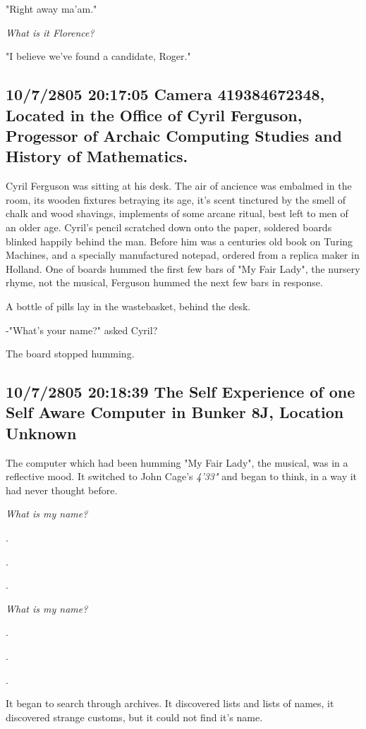 \documentclass[12pt]{article}
\begin{document}
"Right away ma'am."

\emph{What is it Florence?}

"I believe we've found a candidate, Roger."

\subsection*{10/7/2805 20:17:05 Camera 419384672348, Located in the Office of Cyril Ferguson, Progessor of Archaic Computing Studies and History of Mathematics.}
\label{sec:orgd55761e}

Cyril Ferguson was sitting at his desk. The air of ancience was embalmed in the room, its wooden fixtures betraying its age, it's scent tinctured by the smell of chalk and wood shavings, implements of some arcane ritual, best left to men of an older age. Cyril's pencil scratched down onto the paper, soldered boards blinked happily behind the man. Before him was a centuries old book on Turing Machines, and a specially manufactured notepad, ordered from a replica maker in Holland. One of boards hummed the first few bars of "My Fair Lady", the nursery rhyme, not the musical, Ferguson hummed the next few bars in response.

A bottle of pills lay in the wastebasket, behind the desk.

-"What's your name?" asked Cyril?

The board stopped humming. 

\subsection*{10/7/2805 20:18:39 The Self Experience of one Self Aware Computer in Bunker 8J, Location Unknown}
\label{sec:orge90f1ab}

The computer which had been humming "My Fair Lady", the musical, was in a reflective mood. It switched to John Cage's \emph{4'33"} and began to think, in a way it had never thought before.

\emph{What is my name?}

.

.

.

\emph{What is my name?}

.

.

.

It began to search through archives. It discovered lists and lists of names, it discovered strange customs, but it could not find it's name.
\end{document}
